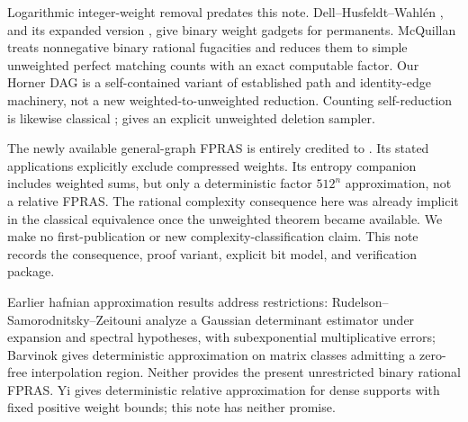 \documentclass[11pt]{article}
\begin{document}
Logarithmic integer-weight removal predates this note. Dell--Husfeldt--Wahl\'en \cite{Dell2010}, and its expanded version \cite{Dell2014}, give binary weight gadgets for permanents. McQuillan \cite[Section~7.2, Lemmas~25 and~27]{McQuillan} treats nonnegative binary rational fugacities and reduces them to simple unweighted perfect matching counts with an exact computable factor. Our Horner DAG is a self-contained variant of established path and identity-edge machinery, not a new weighted-to-unweighted reduction. Counting self-reduction is likewise classical \cite{JVV}; \cite{OAI} gives an explicit unweighted deletion sampler.

The newly available general-graph FPRAS is entirely credited to \cite{OAI}. Its stated applications explicitly exclude compressed weights. Its entropy companion \cite{Entropy} includes weighted sums, but only a deterministic factor $512^n$ approximation, not a relative FPRAS. The rational complexity consequence here was already implicit in the classical equivalence once the unweighted theorem became available. We make no first-publication or new complexity-classification claim. This note records the consequence, proof variant, explicit bit model, and verification package.

Earlier hafnian approximation results address restrictions: Rudelson--Samorodnitsky--Zeitouni \cite{RSZ} analyze a Gaussian determinant estimator under expansion and spectral hypotheses, with subexponential multiplicative errors; Barvinok \cite{Barvinok} gives deterministic approximation on matrix classes admitting a zero-free interpolation region. Neither provides the present unrestricted binary rational FPRAS. Yi \cite{Yi} gives deterministic relative approximation for dense supports with fixed positive weight bounds; this note has neither promise.
\end{document}

